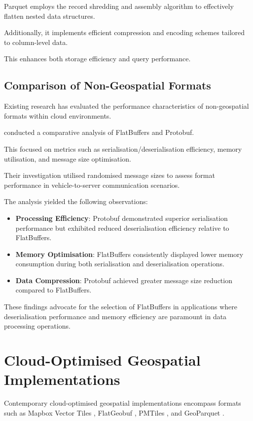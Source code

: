 Parquet employs the record shredding and assembly algorithm \citep{dremel_2010} to effectively flatten nested data structures.

Additionally, it implements efficient compression and encoding schemes tailored to column-level data.

This enhances both storage efficiency and query performance.

\subsection{Comparison of Non-Geospatial Formats}
\label{rw:non_geospatial_formats:comparison}

Existing research has evaluated the performance characteristics of non-geospatial formats within cloud environments.

\citet{daniel_persson_2020} conducted a comparative analysis of FlatBuffers and Protobuf.

This focused on metrics such as serialisation/deserialisation efficiency, memory utilisation, and message size optimisation.

Their investigation utilised randomised message sizes to assess format performance in vehicle-to-server communication scenarios.

The analysis yielded the following observations:

\begin{itemize}
  \item \textbf{Processing Efficiency}: Protobuf demonstrated superior serialisation performance but exhibited reduced deserialisation efficiency relative to FlatBuffers.
  \item \textbf{Memory Optimisation}: FlatBuffers consistently displayed lower memory consumption during both serialisation and deserialisation operations.
  \item \textbf{Data Compression}: Protobuf achieved greater message size reduction compared to FlatBuffers.
\end{itemize}

These findings advocate for the selection of FlatBuffers in applications where deserialisation performance and memory efficiency are paramount in data processing operations.

\section{Cloud-Optimised Geospatial Implementations}
\label{rw:cloud_optimised_implementations}
Contemporary cloud-optimised geospatial implementations encompass formats such as Mapbox Vector Tiles \citep{mapbox-vector-tiles}, FlatGeobuf \citep{flatgeobuf}, PMTiles \citep{pmtiles}, and GeoParquet \citep{geoparquet}.

